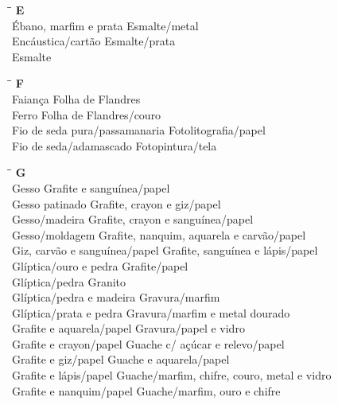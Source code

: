 \begin{tabbing}
	\hspace{8,7cm}\=\hspace{1cm}\=\kill
	\textbf{E} \>  \\ 
	Ébano, marfim e prata	\> Esmalte/metal\\
	Encáustica/cartão \> Esmalte/prata\\
	Esmalte \> \\	   
\end{tabbing}

\begin{tabbing}
	\hspace{8,7cm}\=\hspace{1cm}\=\kill
	\textbf{F} \>  \\ 
	Faiança	\> Folha de Flandres\\
	Ferro \> Folha de Flandres/couro\\
	Fio de seda pura/passamanaria \> Fotolitografia/papel \\	
	Fio de seda/adamascado \> Fotopintura/tela\\   
\end{tabbing}

\begin{tabbing}
	\hspace{8,7cm}\=\hspace{1cm}\=\kill
	\textbf{G} \>  \\ 
	Gesso	\> Grafite e sanguínea/papel\\
	Gesso patinado \> Grafite, crayon e giz/papel\\
	Gesso/madeira \> Grafite, crayon e sanguínea/papel \\	
	Gesso/moldagem \> Grafite, nanquim, aquarela e carvão/papel\\
	Giz, carvão e sanguínea/papel \> Grafite, sanguínea e lápis/papel\\
	Glíptica/ouro e pedra \> Grafite/papel\\
	Glíptica/pedra \> Granito \\	
	Glíptica/pedra e madeira \> Gravura/marfim\\   
	Glíptica/prata e pedra	\> Gravura/marfim e metal dourado\\
	Grafite e aquarela/papel \> Gravura/papel e vidro\\
	Grafite e crayon/papel \> Guache c/ açúcar e relevo/papel \\	
	Grafite e giz/papel \> Guache e aquarela/papel\\ 
	Grafite e lápis/papel \> Guache/marfim, chifre, couro, metal e vidro \\	
	Grafite e nanquim/papel \> Guache/marfim, ouro e chifre\\      
\end{tabbing}

